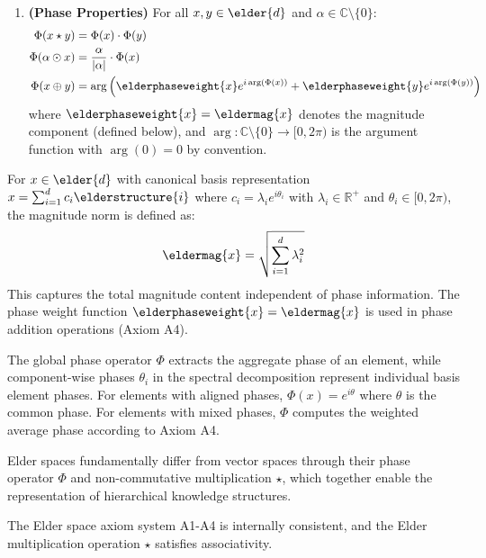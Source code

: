 \begin{definition}
\begin{enumerate}[label=\textbf{A\arabic*}]
    \item \textbf{(Phase Properties)} For all $x, y \in \elder{d}$ and $\alpha \in \mathbb{C} \setminus \{0\}$:
    \begin{align}
        \Phi(x \star y) &= \Phi(x) \cdot \Phi(y)\\
        \Phi(\alpha \odot x) &= \frac{\alpha}{|\alpha|} \cdot \Phi(x)\\
        \Phi(x \oplus y) &= \arg\left(\elderphaseweight{x}e^{i\arg(\Phi(x))} + \elderphaseweight{y}e^{i\arg(\Phi(y))}\right)
    \end{align}
    where $\elderphaseweight{x} = \eldermag{x}$ denotes the magnitude component (defined below), and $\arg: \mathbb{C} \setminus \{0\} \rightarrow [0, 2\pi)$ is the argument function with $\arg(0) = 0$ by convention.
\end{enumerate}
\end{definition}

\begin{definition}
\label{def:elder_magnitude_norm}
For $x \in \elder{d}$ with canonical basis representation $x = \sum_{i=1}^{d} c_i \elderstructure{i}$ where $c_i = \lambda_i e^{i\theta_i}$ with $\lambda_i \in \mathbb{R}^+$ and $\theta_i \in [0, 2\pi)$, the magnitude norm is defined as:
\begin{equation}
\eldermag{x} = \sqrt{\sum_{i=1}^{d} \lambda_i^2}
\end{equation}
This captures the total magnitude content independent of phase information. The phase weight function $\elderphaseweight{x} = \eldermag{x}$ is used in phase addition operations (Axiom A4).
\end{definition}

\begin{remark}
The global phase operator $\Phi$ extracts the aggregate phase of an element, while component-wise phases $\theta_i$ in the spectral decomposition represent individual basis element phases. For elements with aligned phases, $\Phi(x) = e^{i\theta}$ where $\theta$ is the common phase. For elements with mixed phases, $\Phi$ computes the weighted average phase according to Axiom A4.
\end{remark}

Elder spaces fundamentally differ from vector spaces through their phase operator $\Phi$ and non-commutative multiplication $\star$, which together enable the representation of hierarchical knowledge structures.

\begin{theorem}
\label{thm:axiom_consistency}
The Elder space axiom system A1-A4 is internally consistent, and the Elder multiplication operation $\star$ satisfies associativity.
\end{theorem}

